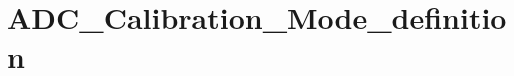 \hypertarget{group___a_d_c___calibration___mode__definition}{\section{A\-D\-C\-\_\-\-Calibration\-\_\-\-Mode\-\_\-definition}
\label{group___a_d_c___calibration___mode__definition}
}

